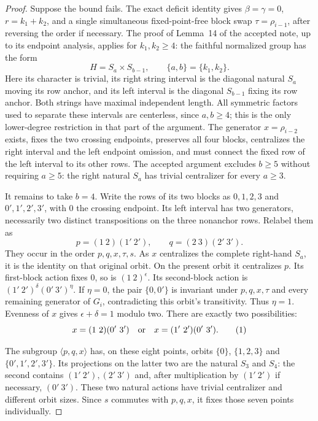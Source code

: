 \documentclass[11pt,a4paper]{article}
\newcommand{\gen}[1]{\langle#1\rangle}
\begin{document}
\begin{proof}
Suppose the bound fails. The exact deficit identity gives
$\beta=\gamma=0$, $r=k_1+k_2$, and a single simultaneous
fixed-point-free block swap $\tau=\rho_{i-1}$, after reversing
the order if necessary. The proof of Lemma~14 of the accepted
note, up to its endpoint analysis, applies for $k_1,k_2\geq4$:
the faithful normalized group has the form
\[
 H=S_a\times S_{b-1},\qquad \{a,b\}=\{k_1,k_2\}.
\]
Here its character is trivial, its right string interval is
the diagonal natural $S_a$ moving its row anchor, and its left
interval is the diagonal $S_{b-1}$ fixing its row anchor.
Both strings have maximal independent length. All symmetric
factors used to separate these intervals are centerless,
since $a,b\geq4$; this is the only lower-degree restriction in
that part of the argument. The generator $x=\rho_{i-2}$ exists,
fixes the two crossing endpoints, preserves all four blocks,
centralizes the right interval and the left endpoint omission,
and must connect the fixed row of the left interval to its
other rows. The accepted argument excludes $b\geq5$ without
requiring $a\geq5$: the right natural $S_a$ has trivial
centralizer for every $a\geq3$.

It remains to take $b=4$. Write the rows of its two blocks as
$0,1,2,3$ and $0',1',2',3'$, with $0$ the crossing endpoint.
Its left interval has two generators, necessarily two distinct
transpositions on the three nonanchor rows. Relabel them as
\[
 p=(1\ 2)(1'\ 2'),\qquad
 q=(2\ 3)(2'\ 3').
\]
They occur in the order $p,q,x,\tau,s$. As $x$ centralizes
the complete right-hand $S_a$, it is the identity on that
original orbit. On the present orbit it centralizes $p$.
Its first-block action fixes $0$, so is $(1\ 2)^\epsilon$.
Its second-block action is
$(1'\ 2')^\delta(0'\ 3')^\eta$.
If $\eta=0$, the pair $\{0,0'\}$ is invariant under
$p,q,x,\tau$ and every remaining generator of $G_i$,
contradicting this orbit's transitivity. Thus $\eta=1$.
Evenness of $x$ gives $\epsilon+\delta=1$ modulo two.
There are exactly two possibilities:
\[
 x=(1\ 2)(0'\ 3')\quad\hbox{or}\quad
 x=(1'\ 2')(0'\ 3').                                      \tag{1}
\]

The subgroup $\gen{p,q,x}$ has, on these eight points, orbits
$\{0\}$, $\{1,2,3\}$ and $\{0',1',2',3'\}$.
Its projections on the latter two are the natural $S_3$ and
$S_4$: the second contains $(1'\ 2'),(2'\ 3')$ and,
after multiplication by $(1'\ 2')$ if necessary, $(0'\ 3')$.
These two natural actions have trivial centralizer and
different orbit sizes. Since $s$ commutes with $p,q,x$, it
fixes those seven points individually.


\end{proof}
\end{document}
